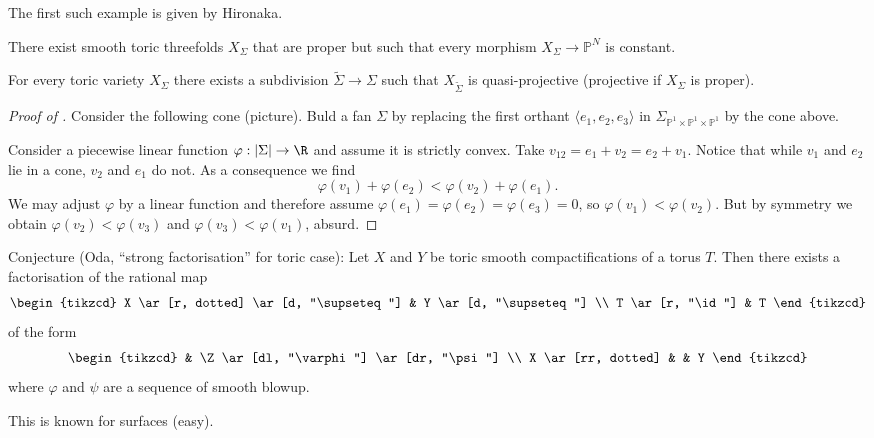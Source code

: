 \documentclass[a4paper]{article}
\renewcommand*{\P}{\mathbb{P}}
\begin{document}
The first such example is given by Hironaka.

\begin{theorem}
  There exist smooth toric threefolds \(X_\Sigma\) that are proper but such that every morphism \(X_\Sigma \to \P^N\) is constant.
\end{theorem}

\begin{theorem}
  For every toric variety \(X_\Sigma\) there exists a subdivision \(\widetilde \Sigma \to \Sigma\) such that \(X_{\widetilde \Sigma}\) is quasi-projective (projective if \(X_\Sigma\) is proper).
\end{theorem}

\begin{proof}[Proof of ]
  Consider the following cone (picture). Buld a fan \(\Sigma\) by replacing the first orthant \(\langle e_1, e_2, e_3\rangle\) in \(\Sigma_{\P^1 \times \P^1 \times \P^1}\) by the cone above.

  Consider a piecewise linear function \(\varphi: |\Sigma| \to \R\) and assume it is strictly convex. Take \(v_{12} = e_1 + v_2 = e_2 + v_1\). Notice that while \(v_1\) and \(e_2\) lie in a cone, \(v_2\) and \(e_1\) do not. As a consequence we find
  \[
    \varphi(v_1) + \varphi(e_2) < \varphi(v_2) + \varphi(e_1).
  \]
  We may adjust \(\varphi\) by a linear function and therefore assume \(\varphi(e_1) = \varphi(e_2) = \varphi(e_3) = 0\), so \(\varphi(v_1) < \varphi(v_2)\). But by symmetry we obtain \(\varphi(v_2) < \varphi(v_3)\) and \(\varphi(v_3) < \varphi(v_1)\), absurd.
\end{proof}

Conjecture (Oda, ``strong factorisation'' for toric case): Let \(X\) and \(Y\) be toric smooth compactifications of a torus \(T\). Then there exists a factorisation of the rational map
\[
  \begin{tikzcd}
    X \ar[r, dotted] \ar[d, "\supseteq"] & Y \ar[d, "\supseteq"] \\
    T \ar[r, "\id"] & T
  \end{tikzcd}
\]
of the form
\[
  \begin{tikzcd}
    & \Z \ar[dl, "\varphi"] \ar[dr, "\psi"] \\
    X \ar[rr, dotted] & & Y
  \end{tikzcd}
\]
where \(\varphi\) and \(\psi\) are a sequence of smooth blowup.

This is known for surfaces (easy).
\end{document}
